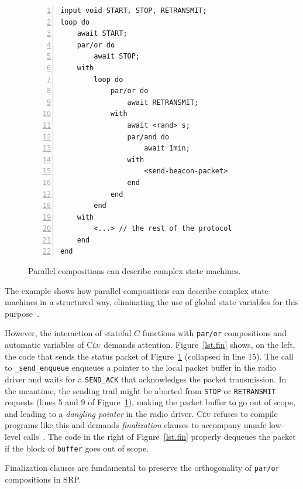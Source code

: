 \documentclass{acm_proc_article-sp}
\newcommand{\CEU}{\textsc{C\'{e}u}\xspace}
\newcommand{\code}[1] {{\small{\texttt{#1}}}}
\newcommand{\1}{\;}
\newcommand{\2}{\;\;}
\newcommand{\3}{\;\;\;}
\newcommand{\5}{\;\;\;\;\;}
\begin{document}
\begin{figure}[t]
\begin{lstlisting}[numbers=left,xleftmargin=3em]
input void START, STOP, RETRANSMIT;
loop do
    await START;
    par/or do
        await STOP;
    with
        loop do
            par/or do
                await RETRANSMIT;
            with
                await <rand> s;
                par/and do
                    await 1min;
                with
                    <send-beacon-packet>
                end
            end
        end
    with
        <...> // the rest of the protocol
    end
end
\end{lstlisting}
\caption{ Parallel compositions can describe complex state machines.
\label{lst.ctp}
}
\end{figure}

The example shows how parallel compositions can describe complex state machines 
in a structured way, eliminating the use of global state variables for this 
purpose~\cite{ceu.sensys13}.


%
However, the interaction of stateful $C$ functions with \code{par/or} 
compositions and automatic variables of \CEU demands attention.
%
Figure~\ref{lst.fin} shows, on the left, the code that sends the status packet 
of Figure~\ref{lst.ctp} (collapsed in line 15).
%
The call to \code{\_send\_enqueue} enqueues a pointer to the local packet 
buffer in the radio driver and waits for a \code{SEND\_ACK} that acknowledges
the packet transmission.
%
In the meantime, the sending trail might be aborted from \code{STOP} or 
\code{RETRANSMIT} requests (lines 5 and 9 of Figure~\ref{lst.ctp}), making the 
packet buffer to go out of scope, and leading to a \emph{dangling pointer} in 
the radio driver.
%
\CEU refuses to compile programs like this and demands \emph{finalization} 
clauses to accompany unsafe low-level calls~\cite{ceu.sensys13}.
The code in the right of Figure~\ref{lst.fin} properly dequeues the packet if
the block of \code{buffer} goes out of scope.

Finalization clauses are fundamental to preserve the orthogonality of 
\code{par/or} compositions in SRP.
\end{document}
